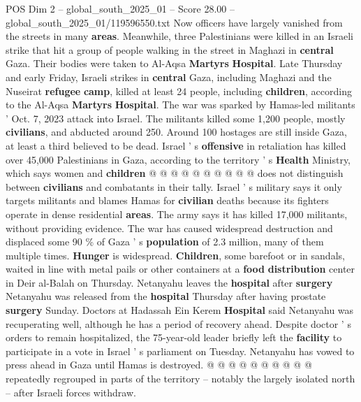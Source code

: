 \begin{textsample}{POS Dim 2 – global\_south\_2025\_01 – Score 28.00 – global\_south\_2025\_01/119596550.txt}
Now officers have largely vanished from the streets in many \textbf{areas}.
Meanwhile, three Palestinians were killed in an Israeli strike that hit a group of people walking in the street in Maghazi in \textbf{central} Gaza.
Their bodies were taken to Al-Aqsa \textbf{Martyrs} \textbf{Hospital}.
Late Thursday and early Friday, Israeli strikes in \textbf{central} Gaza, including Maghazi and the Nuseirat \textbf{refugee} \textbf{camp}, killed at least 24 people, including \textbf{children}, according to the Al-Aqsa \textbf{Martyrs} \textbf{Hospital}.
The war was sparked by Hamas-led militants ' Oct. 7, 2023 attack into Israel.
The militants killed some 1,200 people, mostly \textbf{civilians}, and abducted around 250.
Around 100 hostages are still inside Gaza, at least a third believed to be dead.
Israel ' s \textbf{offensive} in retaliation has killed over 45,000 Palestinians in Gaza, according to the territory ' s \textbf{Health} Ministry, which says women and \textbf{children} @ @ @ @ @ @ @ @ @ @ does not distinguish between \textbf{civilians} and combatants in their tally.
Israel ' s military says it only targets militants and blames Hamas for \textbf{civilian} deaths because its fighters operate in dense residential \textbf{areas}.
The army says it has killed 17,000 militants, without providing evidence.
The war has caused widespread destruction and displaced some 90 \% of Gaza ' s \textbf{population} of 2.3 million, many of them multiple times. \textbf{Hunger} is widespread. \textbf{Children}, some barefoot or in sandals, waited in line with metal pails or other containers at a \textbf{food} \textbf{distribution} center in Deir al-Balah on Thursday.
Netanyahu leaves the \textbf{hospital} after \textbf{surgery} Netanyahu was released from the \textbf{hospital} Thursday after having prostate \textbf{surgery} Sunday.
Doctors at Hadassah Ein Kerem \textbf{Hospital} said Netanyahu was recuperating well, although he has a period of recovery ahead.
Despite doctor ' s orders to remain hospitalized, the 75-year-old leader briefly left the \textbf{facility} to participate in a vote in Israel ' s parliament on Tuesday.
Netanyahu has vowed to press ahead in Gaza until Hamas is destroyed. @ @ @ @ @ @ @ @ @ @ repeatedly regrouped in parts of the territory -- notably the largely isolated north -- after Israeli forces withdraw.

\end{textsample}
